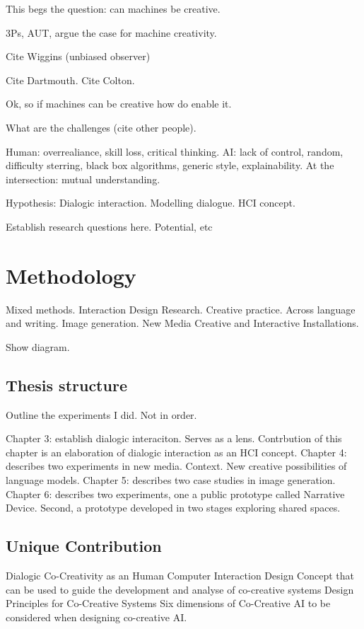 This begs the question: can machines be creative. 

3Ps, AUT, argue the case for machine creativity. 

Cite Wiggins (unbiased observer)

Cite Dartmouth. Cite Colton. 

Ok, so if machines can be creative how do enable it. 

What are the challenges (cite other people). 

Human: overrealiance, skill loss, critical thinking. 
AI: lack of control, random, difficulty sterring, black box algorithms, generic style, explainability. 
At the intersection: mutual understanding.

Hypothesis: 
Dialogic interaction. 
Modelling dialogue. 
HCI concept. 

Establish research questions here. 
Potential, etc

\section{Methodology}

Mixed methods. 
Interaction Design Research. 
Creative practice. 
Across language and writing. 
Image generation. 
New Media Creative and Interactive Installations. 

Show diagram. 

\subsection{Thesis structure}
Outline the experiments I did. 
Not in order. 

Chapter 3: establish dialogic interaciton. Serves as a lens. Contrbution of this chapter is an elaboration of dialogic interaction as an HCI concept. 
Chapter 4: describes two experiments in new media. Context. New creative possibilities of language models. 
Chapter  5: describes two case studies in image generation. 
Chapter 6: describes two experiments, one a public prototype called Narrative Device. Second, a prototype developed in two stages exploring shared spaces. 

\subsection{Unique Contribution
}
Dialogic Co-Creativity as an Human Computer Interaction Design Concept that can be used to guide the development and analyse of co-creative systems
Design Principles for Co-Creative Systems
Six dimensions of Co-Creative AI to be considered when designing co-creative AI. 

